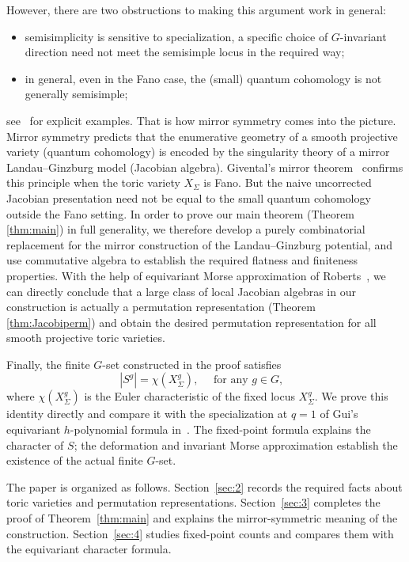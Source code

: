 \documentclass[12pt]{amsart}
\theoremstyle{remark}
\begin{document}
However, there are two obstructions to making this argument work in general: 
\begin{itemize}
    \item semisimplicity is sensitive to specialization, a specific choice of $G$-invariant direction need not meet the semisimple locus in the required way; 
    \item in general, even in the Fano case, the (small) quantum cohomology is not generally semisimple;
\end{itemize}
see~\cite{OstroverTyomkin} for explicit examples. 
That is how mirror symmetry comes into the picture. 
Mirror symmetry predicts that the enumerative geometry of a smooth projective variety (quantum cohomology) is encoded by the singularity theory of a mirror Landau--Ginzburg model (Jacobian algebra). Givental's mirror theorem~\cite{Givental} confirms this principle when the toric variety $X_{\Sigma}$ is Fano. But the naive uncorrected Jacobian presentation need not be equal to the small quantum cohomology outside the Fano setting.
In order to prove our main theorem (Theorem \ref{thm:main}) in full generality, we therefore develop a purely combinatorial replacement for the mirror construction of the Landau--Ginzburg potential, and use commutative algebra to establish the required flatness and finiteness properties. With the help of equivariant Morse approximation of Roberts~\cite{Roberts}, we can directly conclude that a large class of local Jacobian algebras in our construction is actually a permutation representation (Theorem \ref{thm:Jacobiperm}) and obtain the desired permutation representation for all smooth projective toric varieties.

Finally, the finite $G$-set constructed in the proof satisfies
\begin{equation*}
  |S^g|=\chi(X_\Sigma^g), \quad \text{ for any $g\in G,$ }
\end{equation*}
where $\chi(X_\Sigma^g)$ is the Euler characteristic of the fixed locus $X_\Sigma^g$. We prove this identity directly and compare it with the specialization at
$q=1$ of Gui's equivariant $h$-polynomial formula in~\cite{Gui}. The fixed-point
formula explains the character of $S$; the deformation and invariant Morse
approximation establish the existence of the actual finite $G$-set.

The paper is organized as follows.  Section~\ref{sec:2} records the required facts about toric varieties and permutation representations. 
Section~\ref{sec:3} completes the proof of
Theorem~\ref{thm:main} and explains the mirror-symmetric meaning of the
construction. Section~\ref{sec:4} studies fixed-point counts and compares them with the
equivariant character formula.
\end{document}

